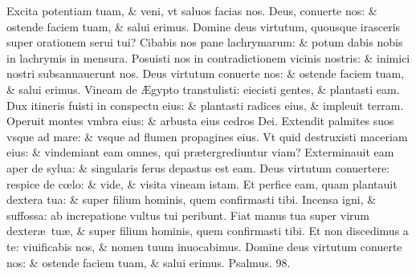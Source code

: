\documentclass[a5paper,10pt]{book}
\def\ae{æ}
\def\AE{Æ}
\def\oe{œ}
\begin{document}
\begin{multicols*}{2}
\newline \color{red} E\color{black}xcita potentiam tuam, \& veni, vt saluos facias nos.
\newline \color{red} D\color{black}eus, conuerte nos: \& ostende faciem tuam, \& salui erimus.
\newline \color{red} D\color{black}omine deus virtutum, quousque irasceris super orationem serui tui?
\newline \color{red} C\color{black}ibabis nos pane lachrymarum: \& potum dabis nobis in lachrymis in mensura.
\newline \color{red} P\color{black}osuisti nos in contradictionem vicinis nostris: \& inimici nostri subsannauerunt nos.
\newline \color{red} D\color{black}eus virtutum conuerte nos: \& ostende faciem tuam, \& salui erimus.
\newline \color{red} V\color{black}ineam de \AE gypto transtulisti: eiecisti gentes, \& plantasti eam.
\newline \color{red} D\color{black}ux itineris fuisti in conspectu eius: \& plantasti radices eius, \& impleuit terram.
\newline \color{red} O\color{black}peruit montes vmbra eius: \& arbusta eius cedros Dei.
\newline \color{red} E\color{black}xtendit palmites suos vsque ad mare: \& vsque ad flumen propagines eius.
\newline \color{red} V\color{black}t quid destruxisti maceriam eius: \& vindemiant eam omnes, qui pr\ae tergrediuntur viam?
\newline \color{red} E\color{black}xterminauit eam aper de sylua: \& singularis ferus depastus est eam.
\newline \color{red} D\color{black}eus virtutum conuertere: respice de c\oe lo: \& vide, \& visita vineam istam.
\newline \color{red} E\color{black}t perfice eam, quam plantauit dextera tua: \& super filium hominis, quem confirmasti tibi.
\newline \color{red} I\color{black}ncensa igni, \& suffossa: ab increpatione vultus tui peribunt.
\newline \color{red} F\color{black}iat manus tua super virum dexter\ae \ tu\ae , \& super filium hominis, quem confirmasti tibi.
\newline \color{red} E\color{black}t non discedimus a te: viuificabis nos, \& nomen tuum inuocabimus.
\newline \color{red} D\color{black}omine deus virtutum conuerte nos: \& ostende faciem tuam, \& salui erimus. \quad \color{red} Psalmus. \hypertarget{ps98}{98.} \color{black}

\end{multicols*}
\end{document}
